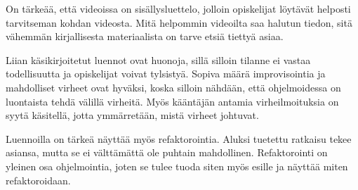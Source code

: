 On tärkeää, että videoissa on sisällysluettelo, jolloin opiskelijat löytävät
helposti tarvitseman kohdan videosta. Mitä helpommin videoilta saa halutun
tiedon, sitä vähemmän kirjallisesta materiaalista on tarve etsiä tiettyä asiaa.

Liian käsikirjoitetut luennot ovat huonoja, sillä silloin tilanne ei vastaa
todellisuutta ja opiskelijat voivat tylsistyä. Sopiva määrä improvisointia ja
mahdolliset virheet ovat hyväksi, koska silloin nähdään, että ohjelmoidessa on
luontaista tehdä välillä virheitä. Myös kääntäjän antamia virheilmoituksia on
syytä käsitellä, jotta ymmärretään, mistä virheet johtuvat.

Luennoilla on tärkeä näyttää myös refaktorointia. Aluksi tuetettu ratkaisu tekee
asiansa, mutta se ei välttämättä ole puhtain mahdollinen. Refaktorointi on
yleinen osa ohjelmointia, joten se tulee tuoda siten myös esille ja näyttää
miten refaktoroidaan.
